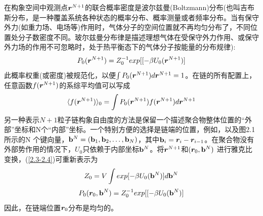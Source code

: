 在构象空间中观测点$\bm{r}^{N+1}$的联合概率密度是波尔兹曼(Boltzmann)分布(也叫吉布斯分布，是一种覆盖系统各种状态的概率分布、概率测量或者频率分布。当有保守外力(如重力场、电场等)作用时，气体分子的空间位置就不再均匀分布了，不同位置处分子数密度不同。玻尔兹曼分布律是描述理想气体在受保守外力作用、或保守外力场的作用不可忽略时，处于热平衡态下的气体分子按能量的分布规律):\\
\begin{gather}
P_0(\bm{r}^{N+1})=Z_{0}^{-1}exp[[-\beta U_{0}(\bm{r}^{N+1})]
\label{2.4}
\end{gather}
此概率权重(或密度)被规范化，以便$\int P_0(\bm{r}^{N+1}) d\bm{r}^{N+1}=1$。在链的所有配置上，任意函数$f(\bm{r}^{N+1})$的系综平均值可以写成\\
\begin{gather}
\langle f(\bm{r}^{N+1})\rangle _0 =  \int P_0(\bm{r}^{N+1})f(\bm{r}^{N+1})d\bm{r}^{N+1}
\label{2.5}
\end{gather}
另一种表示$N+1$粒子链构象自由度的方法是保留一个描述聚合物整体位置的“外部”坐标和N个“内部”坐标。一个特别方便的选择是链端的位置，例如，以及图2.1所示的N 个键向量，$\mathbf{b}^{N}=(\mathbf{b}_1,\mathbf{b}_2,\ldots,\mathbf{b}_{N})$，其中$\mathbf{b}_{i}=\bm{r}_{i}-\bm{r}_{i-1}$。在聚合物没有外部势作用的情况下，$U_0$只依赖于内部坐标$\mathbf{b}^{N}$。将$\bm{r}^{N+1}$和$(\bm{r}_0,\mathbf{b}^{N})$ 进行雅克比变换，(\ref{2.3-2.4})可重新表示为\\
\begin{gather}
Z_0 = V \int exp[-\beta U_{0}(\mathbf{b}^{N})]d\mathbf{b}^{N}
\label{2.6}
\end{gather}
\begin{gather}
P_0(\bm{r}_0,\mathbf{b}^{N})=Z_{0}^{-1}exp[[-\beta U_{0}(\mathbf{b}^{N})]
\label{2.7}
\end{gather}
因此，在链端位置$\bm{r}_0$分布是均匀的。\\

